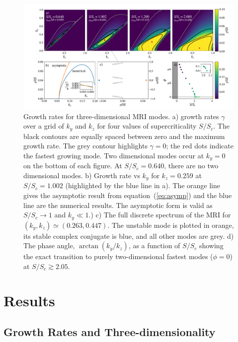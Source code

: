 \documentclass[openacc]{rsproca_new}%
\newcommand{\SSC}{S/S_{c}}
\begin{document}
\begin{figure}[ht]
  \includegraphics[width=\textwidth]{fig_1.pdf}
  \caption{Growth rates for three-dimensional MRI modes. 
  a) growth rates $\gamma$ over a grid of $k_{y}$ and $k_{z}$ for four values of supercriticality $\SSC$. 
  The black contours are equally spaced between zero and the maximum growth rate.
  The grey contour highlights $\gamma=0$; the red dots indicate the fastest growing mode. 
Two dimensional modes occur at $k_{y} = 0$ on the bottom of each figure.
  At $\SSC=0.640$, there are no two dimensional modes. 
  b) Growth rate vs $k_{y}$ for $k_{z}=0.259$ at $\SSC=1.002$ (highlighted by the blue line in a). 
  The orange line gives the asymptotic result from equation~(\ref{eq:asymp}) and the blue line are the numerical results. 
  The asymptotic form is valid as $\SSC\to1$ and $k_{y}\ll1$.) c) The full discrete spectrum of the MRI for $(k_{y},k_{z})\simeq(0.263,0.447)$. 
  The unstable mode is plotted in orange, its stable complex conjugate is blue, and all other modes are grey. 
  d) The phase angle, $\arctan(k_{y}/k_{z})$, as a function of $\SSC$ showing the exact transition to purely two-dimensional fastest modes ($\phi=0$) at $\SSC\gtrsim2.05$. }
  \label{fig:growth_rate}
\end{figure}

\section{Results}
\label{sec:results}

\subsection{Growth Rates and Three-dimensionality}
\label{sec:growth}
\end{document}
